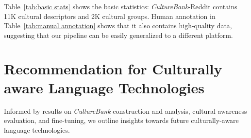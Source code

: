 \documentclass{article} %
\newcommand{\yutong}[1]{\textcolor{orange}{[#1 --Yutong]}}
\newcommand{\dataname}{\textit{CultureBank}\xspace}
\begin{document}
%  

Table~\ref{tab:basic stats} shows the basic statistics: \dataname-Reddit contains 11K cultural descriptors and 2K cultural groups. Human annotation in Table~\ref{tab:manual annotation}  shows that it also contains high-quality data, suggesting that our pipeline can be easily generalized to a different platform. 







\section{Recommendation for Culturally aware Language Technologies}
\label{sec:insights}
\vspace{-1em}
Informed by results on \dataname construction  and analysis,  
cultural awareness evaluation, %
and fine-tuning,
we outline insights towards future culturally-aware language technologies. %
\end{document}
